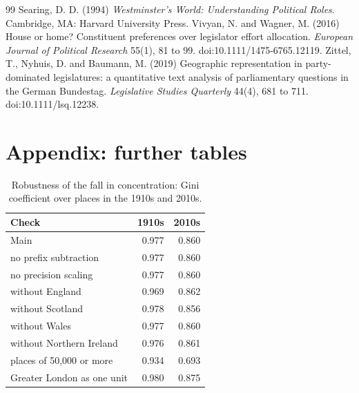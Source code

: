 \documentclass[11pt,a4paper]{article}
\begin{document}
\begin{thebibliography}{99}
 Searing, D. D. (1994) \textit{Westminster's World: Understanding Political Roles}. Cambridge, MA: Harvard University Press.
 Vivyan, N. and Wagner, M. (2016) House or home? Constituent preferences over legislator effort allocation. \textit{European Journal of Political Research} 55(1), 81 to 99. doi:10.1111/1475-6765.12119.
 Zittel, T., Nyhuis, D. and Baumann, M. (2019) Geographic representation in party-dominated legislatures: a quantitative text analysis of parliamentary questions in the German Bundestag. \textit{Legislative Studies Quarterly} 44(4), 681 to 711. doi:10.1111/lsq.12238.
\end{thebibliography}

\appendix
\section{Appendix: further tables}
\begin{table}[tbp]\centering\footnotesize\caption{Robustness of the fall in concentration: Gini coefficient over places in the 1910s and 2010s.}\label{tab:concrob}\begin{tabular}{lrr}\toprule Check & 1910s & 2010s\\\midrule
Main & 0.977 & 0.860\\
no prefix subtraction & 0.977 & 0.860\\
no precision scaling & 0.977 & 0.860\\
without England & 0.969 & 0.862\\
without Scotland & 0.978 & 0.856\\
without Wales & 0.977 & 0.860\\
without Northern Ireland & 0.976 & 0.861\\
places of 50,000 or more & 0.934 & 0.693\\
Greater London as one unit & 0.980 & 0.875\\
\bottomrule\end{tabular}\end{table}
\end{document}
